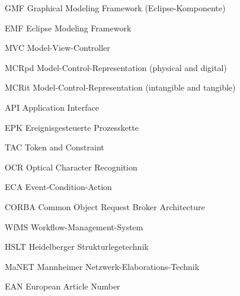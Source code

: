 {GMF}
{Graphical Modeling Framework (Eclipse-Komponente)}

{EMF}
{Eclipse Modeling Framework}

{MVC}
{Model-View-Controller}

{MCRpd}
{Model-Control-Representation (physical and digital)}

{MCRit}
{Model-Control-Representation (intangible and tangible)}

{API}
{Application Interface}

{EPK}
{Ereignisgesteuerte Prozesskette}

{TAC}
{Token and Constraint}

{OCR}
{Optical Character Recognition}

{ECA}
{Event-Condition-Action}

{CORBA}
{Common Object Request Broker Architecture}

{WfMS}
{Workflow-Management-System}

{HSLT}
{Heidelberger Strukturlegetechnik}

{MaNET}
{Mannheimer Netzwerk-Elaborations-Technik}

{EAN}
{European Article Number}
